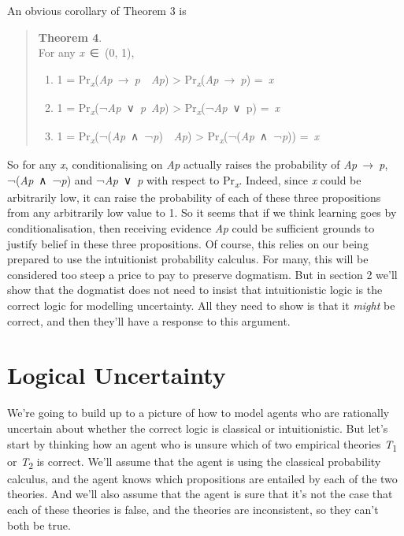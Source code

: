 \documentclass[
  11pt,
  letterpaper,
  DIV=11,
  numbers=noendperiod,
  twoside]{scrartcl}
\providecommand{\tightlist}{%
  \setlength{\itemsep}{0pt}\setlength{\parskip}{0pt}}
\begin{document}
An obvious corollary of Theorem 3 is

\begin{quote}
\textbf{Theorem 4}.\\
For any \emph{x}~∈~(0, 1),

\begin{enumerate}
\def\labelenumi{\arabic{enumi}.}
\tightlist
\item
  1 =
  Pr\textsubscript{\emph{x}}(\emph{Ap}~→~\emph{p}~\textbar~\emph{Ap})
  \textgreater{} Pr\textsubscript{\emph{x}}(\emph{Ap}~→~\emph{p})
  =~\emph{x}
\item
  1 =
  Pr\textsubscript{\emph{x}}(¬\emph{Ap}~∨~\emph{p}\textbar~\emph{Ap})
  \textgreater{} Pr\textsubscript{\emph{x}}(¬\emph{Ap}~∨~p) =~\emph{x}
\item
  1 =
  Pr\textsubscript{\emph{x}}(¬(\emph{Ap}~∧~¬\emph{p})~\textbar~\emph{Ap})
  \textgreater{} Pr\textsubscript{\emph{x}}(¬(\emph{Ap}~∧~¬\emph{p}))
  =~\emph{x}
\end{enumerate}
\end{quote}

So for any \emph{x}, conditionalising on \emph{Ap} actually raises the
probability of \emph{Ap}~→~\emph{p}, ¬(\emph{Ap}~∧~¬\emph{p}) and
¬\emph{Ap}~∨~\emph{p} with respect to Pr\textsubscript{\emph{x}}.
Indeed, since \emph{x} could be arbitrarily low, it can raise the
probability of each of these three propositions from any arbitrarily low
value to 1. So it seems that if we think learning goes by
conditionalisation, then receiving evidence \emph{Ap} could be
sufficient grounds to justify belief in these three propositions. Of
course, this relies on our being prepared to use the intuitionist
probability calculus. For many, this will be considered too steep a
price to pay to preserve dogmatism. But in section 2 we'll show that the
dogmatist does not need to insist that intuitionistic logic is the
correct logic for modelling uncertainty. All they need to show is that
it \emph{might} be correct, and then they'll have a response to this
argument.

\section{Logical Uncertainty}\label{logical-uncertainty}

We're going to build up to a picture of how to model agents who are
rationally uncertain about whether the correct logic is classical or
intuitionistic. But let's start by thinking how an agent who is unsure
which of two empirical theories \emph{T}\textsubscript{1} or
\emph{T}\textsubscript{2} is correct. We'll assume that the agent is
using the classical probability calculus, and the agent knows which
propositions are entailed by each of the two theories. And we'll also
assume that the agent is sure that it's not the case that each of these
theories is false, and the theories are inconsistent, so they can't both
be true.
\end{document}
